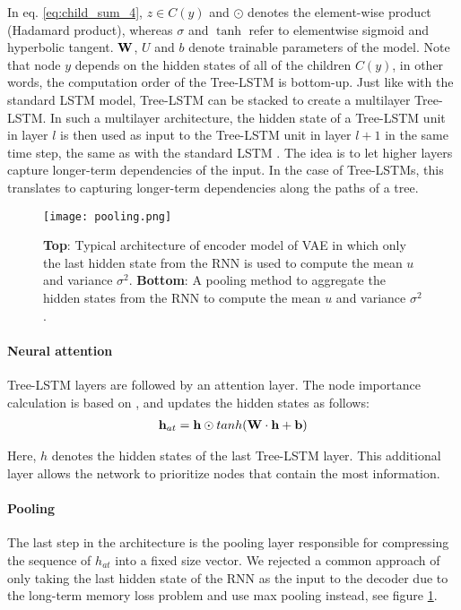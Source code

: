 In eq. \ref{eq:child_sum_4}, $z \in C(y)$ and $\odot$ denotes the element-wise product (Hadamard product), whereas $\sigma$ and $\tanh$ refer to elementwise sigmoid and hyperbolic tangent. 
$\mathbf{W}$, $U$ and $b$ denote trainable parameters of the model. 
Note that node $y$ depends on the hidden states of all of the children $C(y)$, in other words, the computation order of the Tree-LSTM is bottom-up. 
Just like with the standard LSTM model, Tree-LSTM can be stacked to create a multilayer Tree-LSTM. 
In such a multilayer architecture, the hidden state of a Tree-LSTM unit in layer $l$ is then used as input to the Tree-LSTM unit in layer $l + 1$ in the same time step, the same as with the standard LSTM \cite{graves2013hybrid}. 
The idea is to let higher layers capture longer-term dependencies of the input. 
In the case of Tree-LSTMs, this translates to capturing longer-term dependencies along the paths of a tree.

\begin{figure}[ht!]
    \centering
    \texttt{[image: pooling.png]}
    \caption[RNN pooling]{\textbf{Top}: Typical architecture of encoder model of VAE in which only the last hidden state from the RNN is used to compute the mean $u$ and variance $\sigma^2$. \textbf{Bottom}: A pooling method to aggregate the hidden states from the RNN to compute the mean $u$ and variance $\sigma^2$.}
    \label{fig:pooling}
\end{figure}




\paragraph{Neural attention} Tree-LSTM layers are followed by an attention layer. 
The node importance calculation is based on \cite{winata2018attention}, and updates the hidden states as follows:
\begin{align}
    \mathbf{h}_{at} = \mathbf{h} \odot tanh(\mathbf{W} \cdot \mathbf{h} + \mathbf{b})
\end{align}

Here, $h$ denotes the hidden states of the last Tree-LSTM layer. This additional layer allows the network to prioritize nodes that contain the most information. 


\paragraph{Pooling} 
The last step in the architecture is the pooling layer responsible for compressing the sequence of $h_{at}$ into a fixed size vector. 
We rejected a common \cite{fabius2015variational} approach of only taking the last hidden state of the RNN as the input to the decoder due to the long-term memory loss problem \cite{kao2020comparison} and use max pooling instead, see figure \ref{fig:pooling}.



